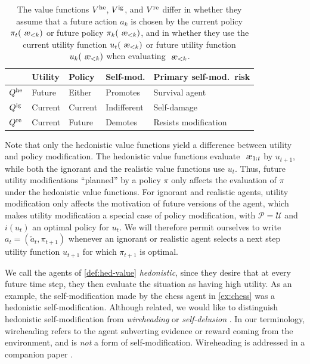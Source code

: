 \documentclass[a4paper]{article}
\theoremstyle{definition}
\theoremstyle{remark}
\let\aechar\ae %
\renewcommand{\ae}{
\ifmmode\mathchoice{
	\mbox{\textsl{\aechar}}
}{
	\mbox{\textsl{\aechar}}
}{
	\mbox{\scriptsize\textsl{\aechar}}
}{
	\mbox{\scriptsize\textsl{\aechar}}
}\else\aechar\fi%
}                         %
\def\U{{\mathcal U}}
\newcommand*{\Qhe}[1][]{Q^{{\rm he} #1}}
\newcommand*{\Vhe}[1][]{V^{{\rm he} #1}}
\newcommand*{\Qig}[1][]{Q^{{\rm ig} #1}}
\newcommand*{\Vig}[1][]{V^{{\rm ig} #1}}
\newcommand*{\Qre}[1][]{Q^{{\rm re} #1}}
\newcommand*{\Vre}[1][]{V^{{\rm re} #1}}
\newcommand*{\Po}{{\mathcal P}}
\renewcommand{\hat}{\check}
\begin{document}
\begin{table}[t]
  \centering
  \bgroup
  \begin{tabular}{|l|l|l|l|l|}
    \hline
    & Utility
    & Policy
    & Self-mod.
    & Primary self-mod.\ risk\\
    \hline
    $\Qhe$
    & \colorbox{red!20}{Future}
    & \colorbox{white!20}{Either}
    & \colorbox{red!20}{Promotes}
    & \colorbox{red!20}{Survival agent}\\
    $\Qig$
    & \colorbox{green!20}{Current}
    & \colorbox{red!20}{Current}
    & \colorbox{white!20}{Indifferent}
    & \colorbox{yellow!20}{Self-damage}\\
    $\Qre$
    & \colorbox{green!20}{Current}
    & \colorbox{green!20}{Future}
    & \colorbox{green!20}{Demotes}
    & \colorbox{green!20}{Resists modification} \\
    \hline
  \end{tabular}
  \egroup
  \caption{
    The value functions $\Vhe$, $\Vig$, and $\Vre$ differ in
    whether they assume that a future action $a_k$ is chosen by
    the current policy $\pi_t(\ae_{<k})$ or future policy $\pi_k(\ae_{<k})$,
    and in whether they use the current utility function $u_t(\ae_{<k})$
    or future utility function $u_k(\ae_{<k})$ when evaluating $\ae_{<k}$.
  }
  \label{tab:value-functions}
\end{table}

Note that only the hedonistic value functions yield a
difference between utility and policy modification.
The hedonistic value functions evaluate $\ae_{1:t}$ by
$u_{t+1}$, while both the ignorant and the realistic value
functions use $u_t$.
Thus, future utility modifications ``planned'' by a policy $\pi$
only affects the evaluation of $\pi$ under the
hedonistic value functions.
For ignorant and realistic agents,
utility modification only affects the motivation of future versions
of the agent, which makes
utility modification a special case of policy modification,
with $\Po=\U$ and $i(u_t)$ an optimal policy for $u_t$.
We will therefore permit ourselves to write $a_t=(\hat a_t,\pi_{t+1})$
whenever an ignorant or realistic agent selects a next
step utility function $u_{t+1}$ for which $\pi_{t+1}$ is optimal.

We call the agents of \cref{def:hed-value} \emph{hedonistic},
since they desire that at every future time step,
they then evaluate the situation as having high utility.
As an example, the self-modification made by the
chess agent in \cref{ex:chess} was a hedonistic self-modification.
Although related,
we would like to distinguish hedonistic self-modification from \emph{wireheading}
or \emph{self-delusion} \citep{Ring2011,Yampolskiy2015}.
In our terminology, wireheading refers to the agent subverting
evidence or reward coming from the environment,
and is \emph{not} a form of self-modification. %
Wireheading is addressed in a companion paper \citep{Everitt2016vrl}.
\end{document}
